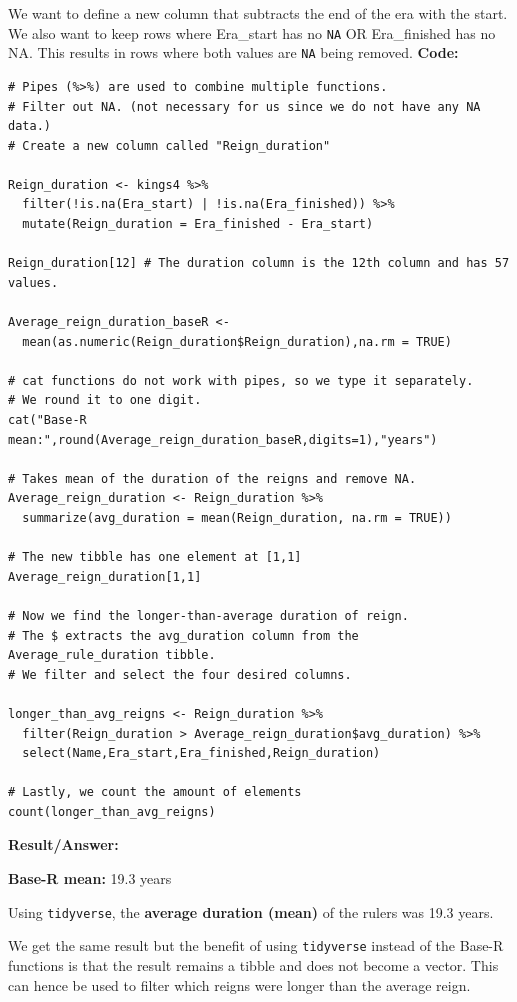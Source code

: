 \documentclass[%
  final,  %
  12pt,  %
  british,
  a4paper
]{article}
\begin{document}
We want to define a new column that subtracts the end of the era with the start. We also want to keep rows where Era\_start has no \verb|NA| OR Era\_finished has no NA. This results in rows where both values are \verb|NA| being removed.
\clearpage
\textbf{Code:}

\begin{lstlisting}
# Pipes (%>%) are used to combine multiple functions.
# Filter out NA. (not necessary for us since we do not have any NA data.)
# Create a new column called "Reign_duration"

Reign_duration <- kings4 %>%
  filter(!is.na(Era_start) | !is.na(Era_finished)) %>% 
  mutate(Reign_duration = Era_finished - Era_start) 
    
Reign_duration[12] # The duration column is the 12th column and has 57 values.

Average_reign_duration_baseR <- 
  mean(as.numeric(Reign_duration$Reign_duration),na.rm = TRUE)

# cat functions do not work with pipes, so we type it separately.
# We round it to one digit.
cat("Base-R mean:",round(Average_reign_duration_baseR,digits=1),"years")

# Takes mean of the duration of the reigns and remove NA.
Average_reign_duration <- Reign_duration %>%
  summarize(avg_duration = mean(Reign_duration, na.rm = TRUE))

# The new tibble has one element at [1,1]
Average_reign_duration[1,1]

# Now we find the longer-than-average duration of reign.
# The $ extracts the avg_duration column from the Average_rule_duration tibble.
# We filter and select the four desired columns.

longer_than_avg_reigns <- Reign_duration %>%
  filter(Reign_duration > Average_reign_duration$avg_duration) %>% 
  select(Name,Era_start,Era_finished,Reign_duration) 

# Lastly, we count the amount of elements
count(longer_than_avg_reigns)
\end{lstlisting}

\textbf{Result/Answer:}

\noindent \textbf{Base-R mean:} 19.3 years

\noindent Using \verb|tidyverse|, the \textbf{average duration (mean)} of the rulers was 19.3 years.

We get the same result but the benefit of using \verb|tidyverse| instead of the Base-R functions is that the result remains a tibble and does not become a vector. This can hence be used to filter which reigns were longer than the average reign.
\end{document}
